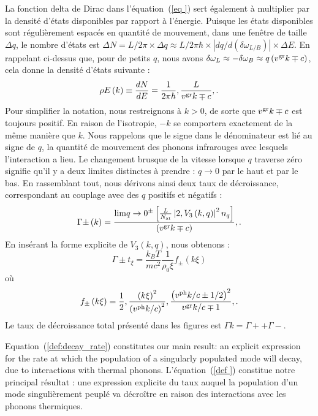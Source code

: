 \documentclass[aps,prd,notitlepage,amsfonts,amssymb,amsmath,nofootinbib,superscriptaddress,longbibliography]{revtex4-2}
\newcommand{\trad}[1]{\textcolor{tradcolor}{#1}}
\begin{document}
\trad{
La fonction delta de Dirac dans l'équation~(\ref{eq
}) sert également à multiplier par la densité d'états disponibles par rapport à l'énergie. Puisque les états disponibles sont régulièrement espacés en quantité de mouvement, dans une fenêtre de taille $\Delta q$, le nombre d'états est $\Delta N = L/2\pi \times \Delta q \approx L/2\pi\hbar \times \left|dq/d\left(\delta \omega_{L/B}\right)\right| \times \Delta E$. En rappelant ci-dessus que, pour de petits $q$, nous avons $\delta \omega_{L} \approx -\delta \omega_{B} \approx q \left(v^{\rm gr}k \mp c\right)$, cela donne la densité d'états suivante :
\begin{equation*}
\rho{E}\left(k\right) \equiv \frac{dN}{dE} = \frac{1}{2\pi\hbar} , \frac{L}{v^{\rm gr}k \mp c} ,.
\end{equation*}
Pour simplifier la notation, nous restreignons à $k > 0$, de sorte que $v^{\rm gr}k \mp c$ est toujours positif. En raison de l'isotropie, $-k$ se comportera exactement de la même manière que $k$. Nous rappelons que le signe dans le dénominateur est lié au signe de $q$, la quantité de mouvement des phonons infrarouges avec lesquels l'interaction a lieu. Le changement brusque de la vitesse lorsque $q$ traverse zéro signifie qu'il y a deux limites distinctes à prendre : $q \to 0$ par le haut et par le bas. En rassemblant tout, nous dérivons ainsi deux taux de décroissance, correspondant au couplage avec des $q$ positifs et négatifs :
\begin{equation*}
\Gamma{\pm}\left(k\right) = \frac{{\rm lim}{q \to 0^{\pm}} \left[ \frac{L}{N_{\rm at}} \left|2 , V_3\left(k,q\right)\right|^{2} n_{q} \right]}{\left(v^{\rm gr}k \mp c\right)} ,.
\end{equation*}
En insérant la forme explicite de $V_3\left(k,q\right)$, nous obtenons :
\begin{equation*}
\Gamma{\pm} t_{\xi} = \frac{k_{B}T}{m c^2} \frac{1}{\rho_{0}\xi} f_{\pm}\left(k\xi\right)
\end{equation*}
où
\begin{equation*}
f_{\pm}\left(k\xi\right) = \frac{1}{2} , \frac{\left(k\xi\right)^{2}}{\left(v^{\rm ph}k/c\right)^{2}} , \frac{\left(v^{\rm ph}k/c \pm 1/2\right)^{2}}{v^{\rm gr}k/c \mp 1} , .
\end{equation*}
Le taux de décroissance total présenté dans les figures est $\Gamma{k} = \Gamma{+} + \Gamma{-} $.
}

Equation~(\ref{def:decay_rate}) constitutes our main result: an explicit expression for the rate at which the population of a singularly populated mode will decay, due to interactions with thermal phonons.
\trad{
L'équation~(\ref{def
}) constitue notre principal résultat : une expression explicite du taux auquel la population d'un mode singulièrement peuplé va décroître en raison des interactions avec les phonons thermiques.
}
\end{document}
